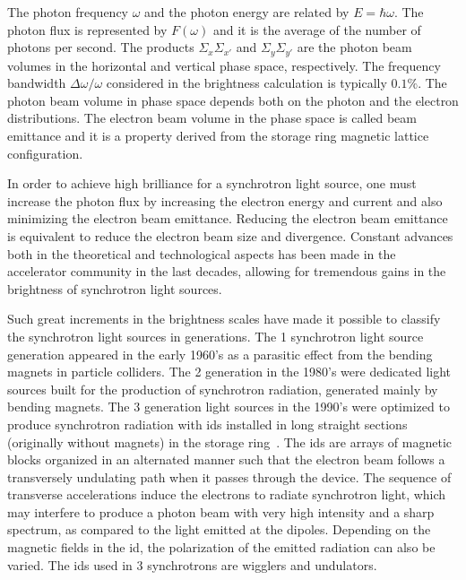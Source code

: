 The photon frequency $\omega$ and the photon energy are related by $E = \hbar \omega$. The photon flux is represented by $F(\omega)$ and it is the average of the number of photons per second. The products $\Sigma_x \Sigma_{x'}$ and $\Sigma_y\Sigma_{y'}$ are the photon beam volumes in the horizontal and vertical phase space, respectively. The frequency bandwidth $\Delta \omega/\omega$ considered in the brightness calculation is typically $0.1\%$. The photon beam volume in phase space depends both on the photon and the electron distributions. The electron beam volume in the phase space is called beam emittance and it is a property derived from the storage ring magnetic lattice configuration.

In order to achieve high brilliance for a synchrotron light source, one must increase the photon flux by increasing the electron energy and current and also minimizing the electron beam emittance. Reducing the electron beam emittance is equivalent to reduce the electron beam size and divergence. Constant advances both in the theoretical and technological aspects has been made in the accelerator community in the last decades, allowing for tremendous gains in the brightness of synchrotron light sources. 

Such great increments in the brightness scales have made it possible to classify the synchrotron light sources in generations. The 1 synchrotron light source generation appeared in the early 1960's as a parasitic effect from the bending magnets in particle colliders. The 2 generation in the 1980's were dedicated light sources built for the production of synchrotron radiation, generated mainly by bending magnets. The 3 generation light sources in the 1990's were optimized to produce synchrotron radiation with \glspl{id} installed in long straight sections (originally without magnets) in the storage ring~\cite{liu2017}. The \glspl{id} are arrays of magnetic blocks organized in an alternated manner such that the electron beam follows a transversely undulating path when it passes through the device. The sequence of transverse accelerations induce the electrons to radiate synchrotron light, which may interfere to produce a photon beam with very high intensity and a sharp spectrum, as compared to the light emitted at the dipoles. Depending on the magnetic fields in the \gls{id}, the polarization of the emitted radiation can also be varied. The \glspl{id} used in 3 synchrotrons are wigglers and undulators.

